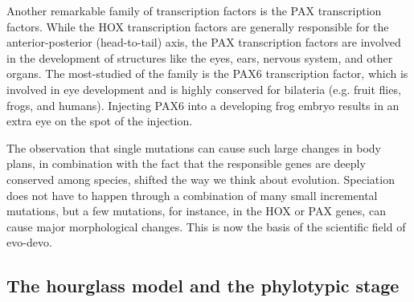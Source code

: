 Another remarkable family of transcription factors is the PAX transcription factors. While the HOX transcription factors are generally responsible for the anterior-posterior (head-to-tail) axis, the PAX transcription factors are involved in the development of structures like the eyes, ears, nervous system, and other organs. The most-studied of the family is the PAX6 transcription factor, which is involved in eye development and is highly conserved for bilateria (e.g. fruit flies, frogs, and humans). Injecting PAX6 into a developing frog embryo results in an extra eye on the spot of the injection\cite{Chow1999}.

The observation that single mutations can cause such large changes in body plans, in combination with the fact that the responsible genes are deeply conserved among species, shifted the way we think about evolution. Speciation does not have to happen through a combination of many small incremental mutations, but a few mutations, for instance, in the HOX or PAX genes, can cause major morphological changes. This is now the basis of the scientific field of evo-devo.

\subsection{The hourglass model and the phylotypic stage}

